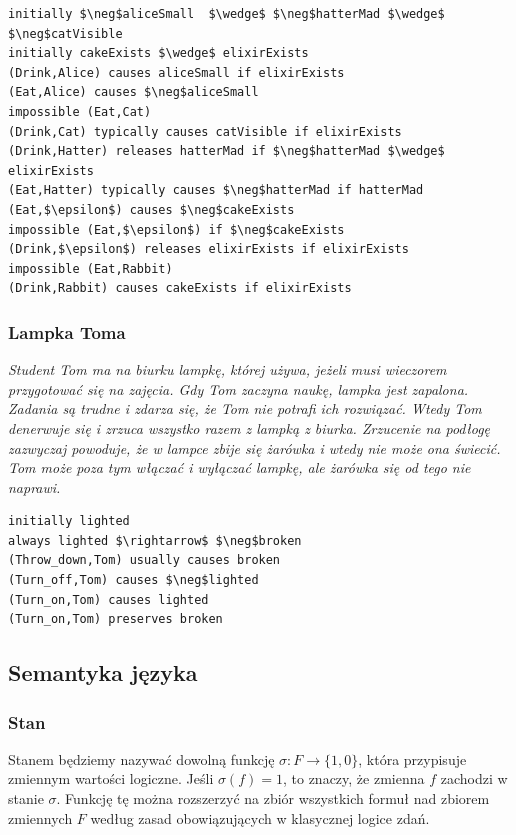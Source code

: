 \documentclass{article}
\begin{document}
\bigskip
{}
\begin{lstlisting}[mathescape=true, breaklines=true]
initially $\neg$aliceSmall  $\wedge$ $\neg$hatterMad $\wedge$ $\neg$catVisible
initially cakeExists $\wedge$ elixirExists
(Drink,Alice) causes aliceSmall if elixirExists
(Eat,Alice) causes $\neg$aliceSmall
impossible (Eat,Cat)
(Drink,Cat) typically causes catVisible if elixirExists
(Drink,Hatter) releases hatterMad if $\neg$hatterMad $\wedge$ elixirExists
(Eat,Hatter) typically causes $\neg$hatterMad if hatterMad
(Eat,$\epsilon$) causes $\neg$cakeExists
impossible (Eat,$\epsilon$) if $\neg$cakeExists
(Drink,$\epsilon$) releases elixirExists if elixirExists
impossible (Eat,Rabbit)
(Drink,Rabbit) causes cakeExists if elixirExists
\end{lstlisting}



\subsubsection{Lampka Toma}

\textit{
    Student Tom ma na biurku lampkę, której używa, jeżeli musi wieczorem przygotować się na zajęcia. 
    Gdy Tom zaczyna naukę, lampka jest zapalona.
    Zadania są trudne i zdarza się, że Tom nie potrafi ich rozwiązać. Wtedy Tom denerwuje się i zrzuca wszystko razem z lampką z biurka. Zrzucenie na podłogę zazwyczaj powoduje, że w lampce zbije się żarówka i wtedy nie może ona świecić.
    Tom może poza tym włączać i wyłączać lampkę, ale żarówka się od tego nie naprawi.
}

\bigskip
{}
\begin{lstlisting}[mathescape=true]
initially lighted
always lighted $\rightarrow$ $\neg$broken
(Throw_down,Tom) usually causes broken
(Turn_off,Tom) causes $\neg$lighted
(Turn_on,Tom) causes lighted
(Turn_on,Tom) preserves broken
\end{lstlisting}


\subsection{Semantyka języka} 

\subsubsection{Stan}
Stanem będziemy nazywać dowolną funkcję $\sigma:F\to \{1,0\}$, która przypisuje zmiennym wartości logiczne. Jeśli $\sigma(f)=1$, to znaczy, że zmienna $f$ zachodzi w stanie $\sigma$. Funkcję tę można rozszerzyć na zbiór wszystkich formuł nad zbiorem zmiennych $F$ według zasad obowiązujących w klasycznej logice zdań.
\end{document}
